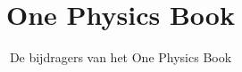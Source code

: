 \documentclass[11pt,a4paper,twoside,openany]{book}
\title{One Physics Book}
\author{De bijdragers van het One Physics Book}
\date{\bookdate}
\begin{document}
\frontmatter



\tableofcontents

\mainmatter





\appendix
\part{\omsolutionspart}




\backmatter
\printindex
\end{document}
